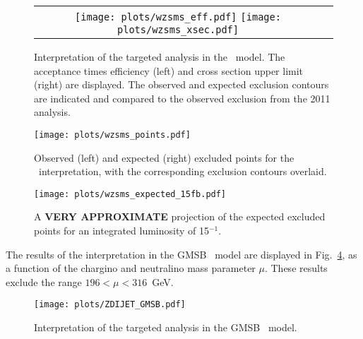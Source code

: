 \begin{figure}[!ht]
\begin{center}
\begin{tabular}{cc}
\texttt{[image: plots/wzsms\_eff.pdf]}
\texttt{[image: plots/wzsms\_xsec.pdf]}
\end{tabular}
\caption{ Interpretation of the targeted analysis in the \wzmet\ model. The acceptance times efficiency (left) and cross section
upper limit (right) are displayed. The observed and expected exclusion contours are indicated and compared to the observed
exclusion from the 2011 analysis. 
\label{fig:results_wzmet}}
\end{center}
\end{figure}

\begin{figure}[!hb]
\begin{center}
\texttt{[image: plots/wzsms\_points.pdf]}
\caption{ Observed (left) and expected (right) excluded points for the \wzmet\ interpretation, with the corresponding exclusion contours overlaid.
\label{fig:results_wzmetpoints}}
\end{center}
\end{figure}

\clearpage

\begin{figure}[!ht]
\begin{center}
\texttt{[image: plots/wzsms\_expected\_15fb.pdf]}
\caption{ A {\bf VERY APPROXIMATE} projection of the expected excluded points for an integrated luminosity of 15$^{-1}$. 
\label{fig:results_15fb}}
\end{center}
\end{figure}

The results of the interpretation in the GMSB \zzmet\ model are displayed in Fig.~\ref{fig:results_gmsb},
as a function of the chargino and neutralino mass parameter $\mu$. These results exclude the range $196 < \mu < 316$~GeV.

\begin{figure}[!hb]
\begin{center}
\texttt{[image: plots/ZDIJET\_GMSB.pdf]}
\caption{ Interpretation of the targeted analysis in the GMSB \zzmet\ model. 
\label{fig:results_gmsb}}
\end{center}
\end{figure}



